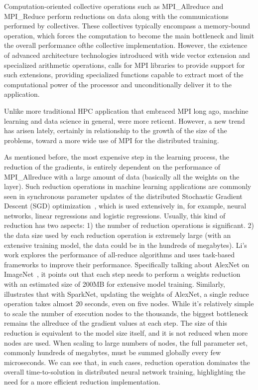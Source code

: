 \documentclass[sigconf]{acmart}
\newcommand{\mpi}[0]{\textsc{MPI}\xspace}
\newcommand{\sve}[0]{\textsc{SVE}\xspace}
\begin{document}
Computation-oriented collective operations such as MPI\_Allreduce and MPI\_Reduce perform reductions on
data along with the communications performed by collectives.
These collectives typically encompass a memory-bound operation, which forces
the computation to become the main bottleneck and limit the overall performance ofthe collective implementation.
However, the existence of advanced architecture technologies introduced
with wide vector extension and specialized arithmetic operations, calls for
MPI libraries to provide support for such extensions, providing specialized functions
capable to extract most of the computational power of the processor and unconditionally deliver it to the application.


Unlike more traditional HPC application that embraced MPI long ago,
machine learning and data science in general, were more reticent. However,
a new trend has arisen lately, certainly in relationship to the growth
of the size of the problems, toward a more wide use of \mpi for the distributed training.

As mentioned before, the most expensive step in the learning process, the reduction of the gradients, is entirely dependent on the performance of MPI\_Allreduce with a large amount of data (basically all the weights on the layer).
Such reduction operations in machine learning applications
are commonly seen in synchronous parameter updates of the distributed Stochastic
Gradient Descent (SGD) optimization~\cite{sgd10}, which is used extensively
in, for example, neural networks, linear regressions and logistic
regressions. Usually, this kind of reduction has two aspects: 1) the number of reduction
operations is significant. 2) the data size used by each reduction operation is extremely large (with an extensive training model, the data could be in the hundreds of megabytes).
%
Li's~\cite{inproceedings} work explores the performance of all-reduce algorithms
and uses task-based frameworks to improve their performance. Specifically talking about AlexNet on ImageNet~\cite{NIPS2012_4824}, it points out that
each step needs to perform a weights reduction with an estimated size
of 200MB for extensive model training.
%
Similarly, \cite{moritz2015sparknet}
illustrates that with SparkNet, updating the weights of AlexNet, a single reduce
operation takes almost 20 seconds, even on five nodes. While it's relatively simple to scale
the number of execution nodes to the thousands, the biggest bottleneck remains the allreduce of
the gradient values at each step. The size of this reduction is equivalent
to the model size itself, and it is not reduced when more
nodes are used. When scaling to large numbers of nodes, the full parameter set, commonly hundreds of
megabytes, must be summed globally every few microseconds. We can see that, in such cases,
reduction operation dominates the overall time-to-solution in distributed neural network
training, highlighting the need for a more efficient reduction implementation.
\end{document}
